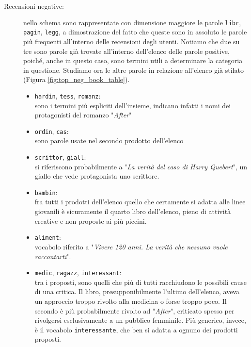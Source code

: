 \begin{description}
					\item[Recensioni negative:] 
					nello schema sono rappresentate con dimensione maggiore le parole \verb|libr|, \verb|pagin|, \verb|legg|, a dimostrazione del fatto che queste sono in assoluto le parole più frequenti all'interno delle recensioni degli utenti. Notiamo che due su tre sono parole già trovate all'interno dell'elenco delle parole positive, poiché, anche in questo caso, sono termini utili a determinare la categoria in questione. Studiamo ora le altre parole in relazione all'elenco già stilato (Figura \ref{fig:top_neg_book_table}).
					
					\begin{itemize}
						\item \texttt{hardin}, \texttt{tess}, \texttt{romanz}: \\
						sono i termini più espliciti dell'insieme, indicano infatti i nomi dei protagonisti del romanzo "\textit{After}"
						\item \texttt{ordin}, \texttt{cas}:\\
						sono parole usate nel secondo prodotto dell'elenco 
						\item \texttt{scrittor}, \texttt{giall}:\\
						si riferiscono probabilmente a "\textit{La verità del caso di Harry Quebert}", un giallo che vede protagonista uno scrittore.
						\item \texttt{bambin}: \\
						fra tutti i prodotti dell'elenco quello che certamente si adatta alle linee giovanili è sicuramente il quarto libro dell'elenco, pieno di attività creative e non proposte ai più piccini.
						\item \texttt{aliment}: \\
						vocabolo riferito a "\textit{Vivere 120 anni. La verità che nessuno vuole raccontarti}".
						\item \texttt{medic}, \texttt{ragazz}, \texttt{interessant}: \\
						tra i proposti, sono quelli che più di tutti racchiudono le possibili cause di una critica. Il libro, presupponibilmente l'ultimo dell'elenco, aveva un approccio troppo rivolto alla medicina o forse troppo poco. Il secondo è più probabilmente rivolto ad "\textit{After}", criticato spesso per rivolgersi esclusivamente a un pubblico femminile. Più generico, invece, è il vocabolo \verb|interessante|, che ben si adatta a ognuno dei prodotti proposti.												
					\end{itemize}
				\end{description}
			
